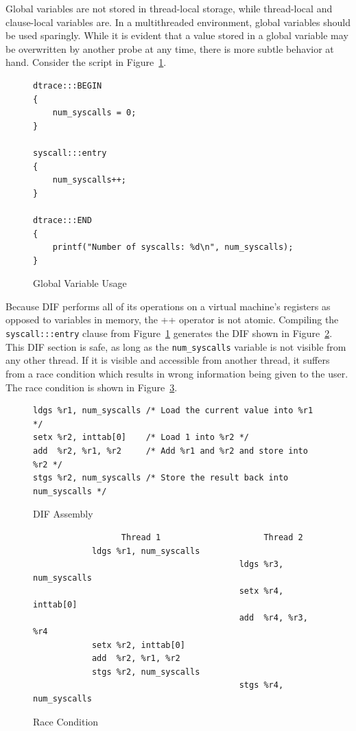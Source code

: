 Global variables are not stored in thread-local storage, while
thread-local and clause-local variables are. In a multithreaded
environment, global variables should be used sparingly. While it is
evident that a value stored in a global variable may be overwritten by
another probe at any time, there is more subtle behavior at
hand. Consider the script in Figure~\ref{fig:global-var-usage}. \newline

\begin{figure}
  \begin{lstlisting}
dtrace:::BEGIN
{
    num_syscalls = 0;
}

syscall:::entry
{
    num_syscalls++;
}
    
dtrace:::END
{
    printf("Number of syscalls: %d\n", num_syscalls);
}
  \end{lstlisting}
  \caption{Global Variable Usage}
  \label{fig:global-var-usage}
\end{figure}

\noindent
Because DIF performs all of its operations on a virtual machine's
registers as opposed to variables in memory, the ++ operator is not
atomic. Compiling the \texttt{syscall:::entry} clause from
Figure~\ref{fig:global-var-usage} generates the DIF shown in
Figure~\ref{fig:dif-asm}.  This DIF section is safe, as long as the
\texttt{num\_syscalls} variable is not visible from any other thread. If it is
visible and accessible from another thread, it suffers from a race
condition which results in wrong information being given to the
user. The race condition is shown in Figure~\ref{fig:race}. \newline

\begin{figure}
\begin{lstlisting}
ldgs %r1, num_syscalls /* Load the current value into %r1 */
setx %r2, inttab[0]    /* Load 1 into %r2 */
add  %r2, %r1, %r2     /* Add %r1 and %r2 and store into %r2 */
stgs %r2, num_syscalls /* Store the result back into num_syscalls */
\end{lstlisting}
\caption{DIF Assembly}
  \label{fig:dif-asm}
\end{figure}

\begin{figure}
  \begin{lstlisting}
                  Thread 1                     Thread 2
            ldgs %r1, num_syscalls
                                          ldgs %r3, num_syscalls
                                          setx %r4, inttab[0]
                                          add  %r4, %r3, %r4
            setx %r2, inttab[0]
            add  %r2, %r1, %r2
            stgs %r2, num_syscalls
                                          stgs %r4, num_syscalls
  \end{lstlisting}
  \caption{Race Condition}
  \label{fig:race}
\end{figure}


